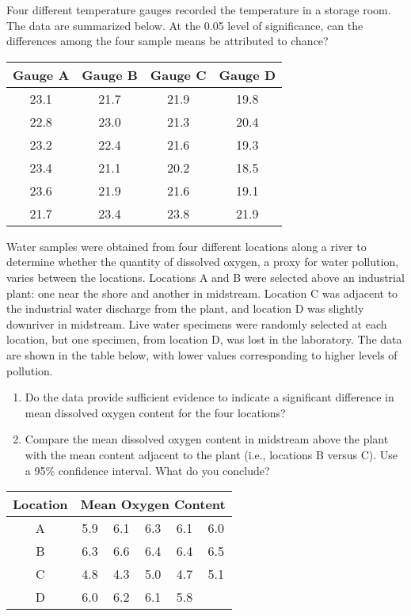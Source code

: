 \begin{problem}
Four different temperature gauges recorded the temperature in a storage room.  The data are summarized
below.  At the 0.05 level of significance, can the differences among the four sample means be attributed to chance?
\begin{table}[H]
\centering
\begin{tabular}{|c|c|c|c|} \hline
\bf{Gauge A} & \bf{Gauge B} & \bf{Gauge C} & \bf{Gauge D} \\ \hline
23.1	&	21.7	&	21.9	&	19.8 \\ \hline
22.8	&	23.0	&	21.3	&	20.4 \\ \hline
23.2	&	22.4	&	21.6	&	19.3 \\ \hline
23.4	&	21.1	&	20.2	&	18.5 \\ \hline
23.6	&	21.9	&	21.6	&	19.1 \\ \hline
21.7	&	23.4	&	23.8	&	21.9 \\ \hline
\end{tabular}
\end{table}
\end{problem}

\begin{problem}
	Water samples were obtained from four different locations along a river to determine
	whether the quantity of dissolved oxygen, a proxy for water pollution, varies between
	the locations.  Locations A and B were selected above an industrial plant: one near
	the shore and another in midstream. Location C was adjacent to the industrial water
	discharge from the plant, and location D was slightly downriver in midstream.  Live
	water specimens were randomly selected at each location, but one specimen, from location
	D, was lost in the laboratory.  The data are shown in the table below, with lower values
	corresponding to higher levels of pollution.
	\begin{enumerate}[label=\alph*)]
	\item Do the data provide sufficient evidence to indicate a significant difference in mean dissolved oxygen
	content for the four locations?
	\item Compare the mean dissolved oxygen content in midstream above the plant with the mean content
	adjacent to the plant (i.e., locations B versus C).  Use a 95\% confidence interval.  What do you conclude?
	\end{enumerate}
	\begin{table}[H]
	\centering
	\begin{tabular}{|c||c|c|c|c|c|} \hline
	\bf{Location} & \multicolumn{5}{c|}{\bf{Mean Oxygen Content}} \\ \hline
	A & 5.9 &  6.1 & 6.3  & 6.1 & 6.0 \\ \hline
	B & 6.3 &  6.6 & 6.4  & 6.4 & 6.5 \\ \hline
	C & 4.8 &  4.3 & 5.0  & 4.7 & 5.1 \\ \hline
	D & 6.0 &  6.2 & 6.1  & 5.8 &     \\ \hline
	\end{tabular}
	\end{table}
\end{problem}

